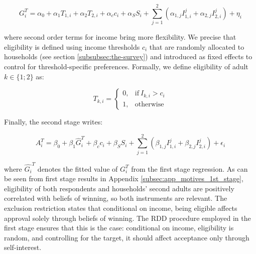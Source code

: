 \documentclass[12pt]{article} %
\begin{document}
\begin{equation}
    G_i^T = \alpha_0 + \alpha_1 T_{1,i} + \alpha_2 T_{2,i} + \alpha_c c_i  + \alpha_S S_i + \sum_{j=1}^2 \left( \alpha_{1,j} I_{1,i}^j + \alpha_{2,j} I_{2,i}^j \right) + \eta_i
    \label{eq:first_stage_parametric_rdd_approve_winner}
\end{equation}

\noindent
where second order terms for income bring more flexibility. We precise that eligibility is defined using income thresholds $c_i$ that are randomly allocated to households (see section \ref{subsubsec:the-survey}) and introduced as fixed effects to control for threshold-specific preferences. Formally, we define eligibility of adult $k\in \{1;2\}$ as:

\begin{equation}
T_{k,i} =
\begin{cases}
  0, & \text{if}\ I_{k,i} > c_i \\
  1, & \text{otherwise}
\end{cases}
\end{equation}

\medskip

\noindent
Finally, the second stage writes:

\begin{equation}
    A_i^T = \beta_0 + \beta_1 \widehat{G}_i^T + \beta_c c_i + \beta_S S_i + \sum_{j=1}^2 \left( \beta_{1,j} I_{1,i}^j + \beta_{2,j} I_{2,i}^j \right) + \epsilon_i
    \label{eq:second_stage_with_rdd_approve_winner}
\end{equation}

\medskip

\noindent
where $\widehat{G_i}^T$ denotes the fitted value of $G_i^T$ from the first stage regression. As can be seen from first stage results in Appendix \ref{subsec:app_motives_1st_stage}, eligibility of both respondents and households' second adults are positively correlated with beliefs of winning, so both instruments are relevant. The exclusion restriction states that conditional on income, being eligible affects approval solely through beliefs of winning. The RDD procedure employed in the first stage ensures that this is the case: conditional on income, eligibility is random, and controlling for the target, it should affect acceptance only through self-interest.
\end{document}
